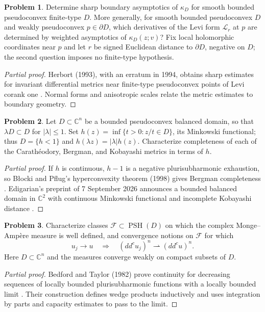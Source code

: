 \documentclass[11pt,reqno]{amsart}
\DeclareMathOperator{\PSH}{PSH}
\theoremstyle{definition}
\newtheorem{problem}{Problem}[section]
\theoremstyle{remark}
\begin{document}
\begin{problem}\label{b95-7-5-2}\label{b95-7-5-6}
Determine sharp boundary asymptotics of $\kappa_D$ for smooth bounded pseudoconvex finite-type $D$. More generally, for smooth bounded pseudoconvex $D$ and weakly pseudoconvex $p\in\partial D$, which derivatives of the Levi form $\mathcal L_r$ at $p$ are determined by weighted asymptotics of $\kappa_D(z;v)$? Fix local holomorphic coordinates near $p$ and let $r$ be signed Euclidean distance to $\partial D$, negative on $D$; the second question imposes no finite-type hypothesis.
\end{problem}
\begin{proof}[Partial proof]
Herbort (1993), with an erratum in 1994, obtains sharp estimates for invariant differential metrics near finite-type pseudoconvex points of Levi corank one \cite{B95-Herbort}. Normal forms and anisotropic scales relate the metric estimates to boundary geometry.
\end{proof}

\begin{problem}\label{b95-7-5-3}
Let $D\subset\mathbb C^n$ be a bounded pseudoconvex balanced domain, so that $\lambda D\subset D$ for $|\lambda|\leq1$. Set $h(z)=\inf\{t>0:z/t\in D\}$, its Minkowski functional; thus $D=\{h<1\}$ and $h(\lambda z)=|\lambda|h(z)$. Characterize completeness of each of the Carath\'eodory, Bergman, and Kobayashi metrics in terms of $h$.
\end{problem}
\begin{proof}[Partial proof]
If $h$ is continuous, $h-1$ is a negative plurisubharmonic exhaustion, so B{\l}ocki and Pflug's hyperconvexity theorem (1998) gives Bergman completeness \cite{B95-BP}. Edigarian's preprint of 7 September 2026 announces a bounded balanced domain in $\mathbb C^2$ with continuous Minkowski functional and incomplete Kobayashi distance \cite{B95-EdigarianBalanced26}.
\end{proof}

\begin{problem}\label{b95-8-1-1}
Characterize classes $\mathcal F\subset\PSH(D)$ on which the complex Monge--Amp\`ere measure is well defined, and convergence notions on $\mathcal F$ for which
\[
 u_j\longrightarrow u
 \quad\Longrightarrow\quad
 (dd^cu_j)^n\rightharpoonup(dd^cu)^n.
\]
Here $D\subset\mathbb C^n$ and the measures converge weakly on compact subsets of $D$.
\end{problem}
\begin{proof}[Partial proof]
Bedford and Taylor (1982) prove continuity for decreasing sequences of locally bounded plurisubharmonic functions with a locally bounded limit \cite{B95-BT}. Their construction defines wedge products inductively and uses integration by parts and capacity estimates to pass to the limit.
\end{proof}
\end{document}
